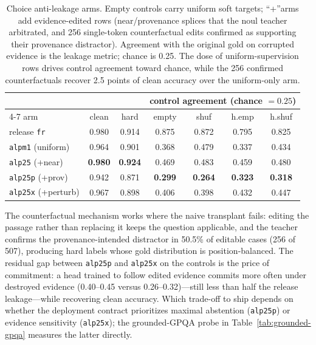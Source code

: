 \documentclass[11pt]{article}
\begin{document}
\begin{table}[t]
\centering\small
\begin{tabular}{lcccccc}
\toprule
 & & & \multicolumn{4}{c}{control agreement (chance $=0.25$)}\\
\cmidrule(lr){4-7}
arm & clean & hard & empty & shuf & h.emp & h.shuf\\
\midrule
release \texttt{fr}        & 0.980 & 0.914 & 0.875 & 0.872 & 0.795 & 0.825\\
\texttt{alpm1} (uniform)   & 0.964 & 0.901 & 0.368 & 0.479 & 0.337 & 0.434\\
\texttt{alp25} (+near)     & \textbf{0.980} & \textbf{0.924} & 0.469 &
0.483 & 0.459 & 0.480\\
\texttt{alp25p} (+prov)    & 0.942 & 0.871 & \textbf{0.299} &
\textbf{0.264} & \textbf{0.323} & \textbf{0.318}\\
\texttt{alp25x} (+perturb) & 0.967 & 0.898 & 0.406 & 0.398 & 0.432 &
0.447\\
\bottomrule
\end{tabular}
\caption{Choice anti-leakage arms. Empty controls carry uniform soft
targets; ``+''arms add evidence-edited rows (near/provenance splices
that the noul teacher arbitrated, and 256 single-token counterfactual
edits confirmed as supporting their provenance distractor). Agreement
with the original gold on corrupted evidence is the leakage metric;
chance is 0.25. The dose of uniform-supervision rows drives control
agreement toward chance, while the 256 confirmed counterfactuals
recover 2.5 points of clean accuracy over the uniform-only arm.}
\label{tab:antileak-choice}
\end{table}

The counterfactual mechanism works where the naive transplant fails:
editing the passage rather than replacing it keeps the question
applicable, and the teacher confirms the provenance-intended
distractor in 50.5\% of editable cases (256 of 507), producing hard
labels whose gold distribution is position-balanced. The residual gap
between \texttt{alp25p} and \texttt{alp25x} on the controls is the
price of commitment: a head trained to follow edited evidence commits
more often under destroyed evidence (0.40--0.45 versus
0.26--0.32)---still less than half the release leakage---while
recovering clean accuracy. Which trade-off to ship depends on whether
the deployment contract prioritizes maximal abstention
(\texttt{alp25p}) or evidence sensitivity (\texttt{alp25x}); the
grounded-GPQA probe in Table~\ref{tab:grounded-gpqa} measures the
latter directly.
\end{document}

